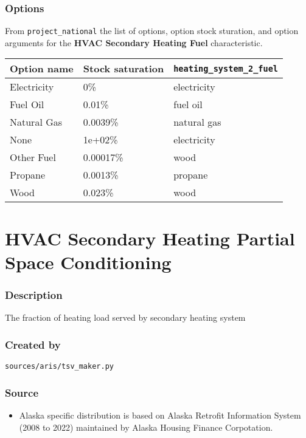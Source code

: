 \subsubsection{Options}\label{options-75}

From \texttt{project\_national} the list of options, option stock
sturation, and option arguments for the \textbf{HVAC Secondary Heating
Fuel} characteristic.

\begin{longtable}[]{@{}lll@{}}
\toprule\noalign{}
Option name & Stock saturation & \texttt{heating\_system\_2\_fuel} \\
\midrule\noalign{}
\endhead
\bottomrule\noalign{}
\endlastfoot
Electricity & 0\% & electricity \\
Fuel Oil & 0.01\% & fuel oil \\
Natural Gas & 0.0039\% & natural gas \\
None & 1e+02\% & electricity \\
Other Fuel & 0.00017\% & wood \\
Propane & 0.0013\% & propane \\
Wood & 0.023\% & wood \\
\end{longtable}

\section{HVAC Secondary Heating Partial Space
Conditioning}\label{hvac_secondary_heating_partial_space_conditioning}

\subsubsection{Description}\label{description-76}

The fraction of heating load served by secondary heating system

\subsubsection{Created by}\label{created-by-76}

\texttt{sources/aris/tsv\_maker.py}

\subsubsection{Source}\label{source-75}

\begin{itemize}
 
\item
  Alaska specific distribution is based on Alaska Retrofit Information
  System (2008 to 2022) maintained by Alaska Housing Finance
  Corpotation.
\end{itemize}

